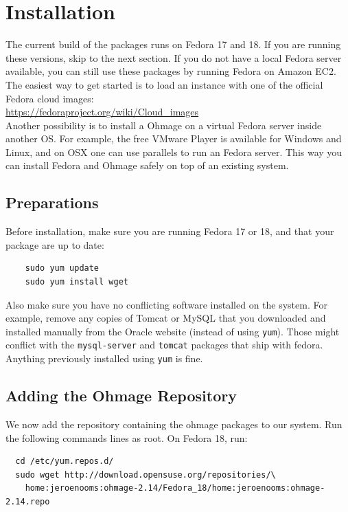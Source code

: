 \documentclass{scrartcl}
\begin{document}
\section{Installation}

The current build of the packages runs on Fedora 17 and 18. If you are running
these versions, skip to the next section. If you do not have a local Fedora
server available, you can still use these packages by running Fedora on Amazon
EC2. The easiest way to get started is to load an instance with one of the
official Fedora cloud images: \\

\url{https://fedoraproject.org/wiki/Cloud_images} \\

\noindent Another possibility is to install a Ohmage on a virtual Fedora server
inside another OS. For example, the free VMware Player is available for Windows 
and Linux, and on OSX one can use parallels to run an Fedora server. This way
you can install Fedora and Ohmage safely on top of an existing system.

\subsection{Preparations}

Before installation, make sure you are running Fedora 17 or 18, and that your
package are up to date:

\begin{verbatim}
    sudo yum update
    sudo yum install wget
\end{verbatim}

Also make sure you have no conflicting software installed on the system. For
example, remove any copies of Tomcat or MySQL that you downloaded and installed
manually from the Oracle website (instead of using \texttt{yum}). Those might
conflict with the \texttt{mysql-server} and \texttt{tomcat} packages that ship
with fedora. Anything previously installed using \texttt{yum} is fine.

\subsection{Adding the Ohmage Repository}

We now add the repository containing the ohmage packages to our system. Run
the following commands lines as root. On Fedora 18, run:

\begin{verbatim}
  cd /etc/yum.repos.d/
  sudo wget http://download.opensuse.org/repositories/\
    home:jeroenooms:ohmage-2.14/Fedora_18/home:jeroenooms:ohmage-2.14.repo
\end{verbatim}
\end{document}
